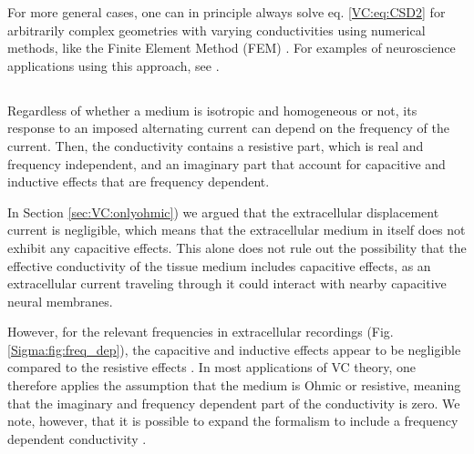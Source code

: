 For more general cases, one can in principle always solve eq. \ref{VC:eq:CSD2} for arbitrarily complex geometries with varying conductivities using numerical methods, like the Finite Element Method (FEM) \citep{Logg2012}. For examples of neuroscience applications using this approach, see \citep{Moffitt2005, Frey2009, Joucla2012, Haufe2015, Ness2015, Buccino2019b, Obien2019}. 


\subsection{ }
\label{sec:Sigma:f-independent}

Regardless of whether a medium is isotropic and homogeneous or not, its response to an imposed alternating current can depend on the frequency of the current. Then, the conductivity contains a resistive part, which is real and frequency independent, and an imaginary part that account for capacitive and inductive effects that are frequency dependent. 

In Section \ref{sec:VC:onlyohmic}) we argued that the extracellular displacement current is negligible, which means that the extracellular medium in itself does not exhibit any capacitive effects. This alone does not rule out the possibility that the effective conductivity of the tissue medium includes capacitive effects, as an extracellular current traveling through it could interact with nearby capacitive neural membranes. 

However, for the relevant frequencies in extracellular recordings (Fig. \ref{Sigma:fig:freq_dep}), the capacitive and inductive effects appear to be negligible compared to the resistive effects \citep{Logothetis2007, Miceli2017, Ranta2017}. In most applications of VC theory, one therefore applies the assumption that the medium is Ohmic or resistive, meaning that the imaginary and frequency dependent part of the conductivity is zero. We note, however, that it is possible to expand the formalism to include a frequency dependent conductivity \citep{Bedard2004, Tracey2011, Miceli2017}. 


